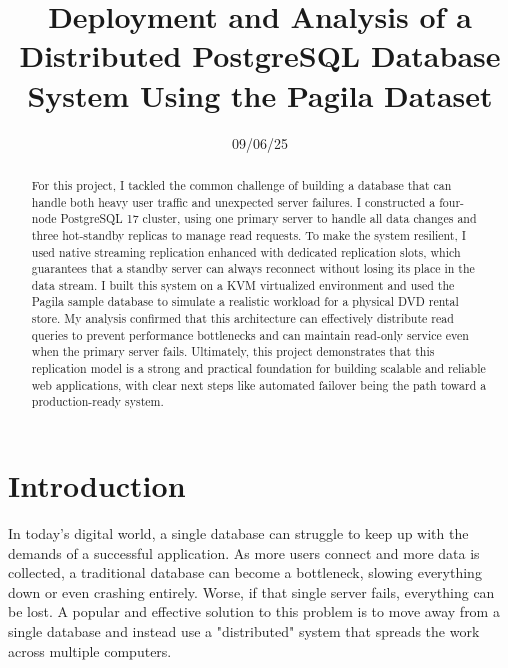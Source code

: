 \documentclass[conference]{IEEEtran}
\begin{document}
\title{Deployment and Analysis of a Distributed PostgreSQL Database System Using the Pagila Dataset}

\author{
}
\date{09/06/25}

\maketitle

\begin{abstract}
For this project, I tackled the common challenge of building a database that can handle both heavy user traffic and unexpected server failures. I constructed a four-node PostgreSQL 17 cluster, using one primary server to handle all data changes and three hot-standby replicas to manage read requests. To make the system resilient, I used native streaming replication enhanced with dedicated replication slots, which guarantees that a standby server can always reconnect without losing its place in the data stream. I built this system on a KVM virtualized environment and used the Pagila sample database to simulate a realistic workload for a physical DVD rental store. My analysis confirmed that this architecture can effectively distribute read queries to prevent performance bottlenecks and can maintain read-only service even when the primary server fails. Ultimately, this project demonstrates that this replication model is a strong and practical foundation for building scalable and reliable web applications, with clear next steps like automated failover being the path toward a production-ready system.


\end{abstract}





\section{Introduction}

In today's digital world, a single database can struggle to keep up with the demands of a successful application. As more users connect and more data is collected, a traditional database can become a bottleneck, slowing everything down or even crashing entirely. Worse, if that single server fails, everything can be lost. A popular and effective solution to this problem is to move away from a single database and instead use a "distributed" system that spreads the work across multiple computers.
\end{document}
